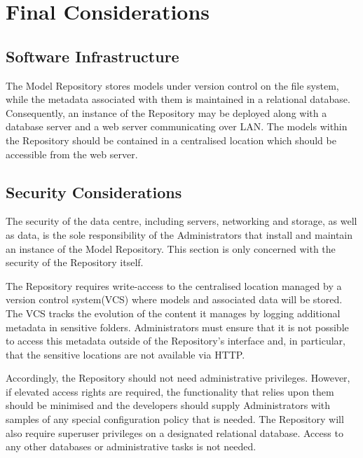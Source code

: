 \section{Final Considerations} 

\subsection{Software Infrastructure}
\label{softwareInfrastructure}
The \ddmore Model Repository stores models under version control on the file system, while the metadata associated with them is maintained in a relational database. Consequently, an instance of the Repository may be deployed along with a database server and a web server communicating over LAN. The models within the Repository should be contained in a centralised location which should be accessible from the web server.

\subsection{Security Considerations}
\label{securityConsiderations}
The security of the data centre, including servers, networking and storage, as well as data, is the sole responsibility of the Administrators that install and maintain an instance of the \ddmore Model Repository. This section is only concerned with the security of the Repository itself. 

The Repository requires write-access to the centralised location managed by a version control system(VCS) where models and associated data will be stored. The VCS tracks the evolution of the content it manages by logging additional metadata in sensitive folders. Administrators must ensure that it is not possible to access this metadata outside of the Repository's interface and, in particular, that the sensitive locations are not available via HTTP. 

Accordingly, the Repository should not need administrative privileges. However, if elevated access rights are required, the functionality that relies upon them should be minimised and the developers should supply Administrators with samples of any special configuration policy that is needed. The Repository will also require superuser privileges on a designated relational database. Access to any other databases or administrative tasks is not needed.

